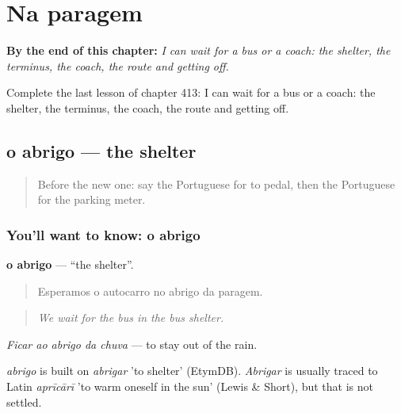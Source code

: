 
\chapter{Na paragem}
\label{ch:pt-na-paragem}

\begin{chapteropening}
\textbf{By the end of this chapter:} \emph{I can wait for a bus or a coach: the shelter, the terminus, the coach, the route and getting off.}

Complete the last lesson of chapter 413: I can wait for a bus or a coach: the shelter, the terminus, the coach, the route and getting off.
\end{chapteropening}

\section[o abrigo]{o abrigo — the shelter}

\label{lesson:PT-C413-abrigo}



\begin{quote}
Before the new one: say the Portuguese for to pedal, then the Portuguese for the parking meter.
\end{quote}

\subsection*{You'll want to know: o abrigo}
\textbf{o abrigo} — \textquotedblleft{}the shelter\textquotedblright{}.

\begin{quote}
Esperamos o autocarro no abrigo da paragem.
\end{quote}

\begin{quote}
\emph{We wait for the bus in the bus shelter.}
\end{quote}

\emph{Ficar ao abrigo da chuva} — to stay out of the rain.

\begin{cousinweb}
\emph{abrigo} is built on \emph{abrigar} 'to shelter' (EtymDB). \emph{Abrigar} is usually traced to Latin \emph{aprīcārī} 'to warm oneself in the sun' (Lewis \& Short), but that is not settled.
\end{cousinweb}

